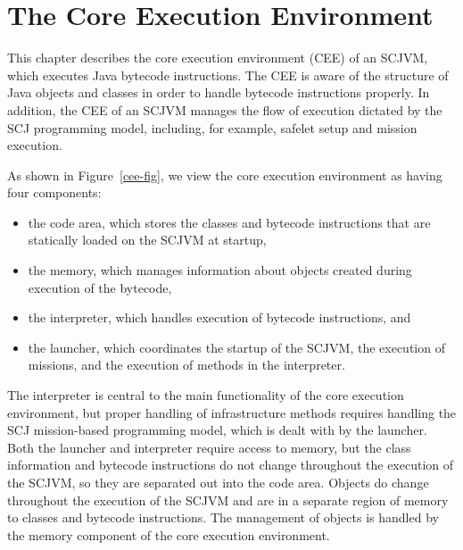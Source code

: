 \chapter{The Core Execution Environment}
\label{cee-chapter}

This chapter describes the core execution environment (CEE) of an
SCJVM, which executes Java bytecode instructions.
The CEE is aware of the structure of Java objects and classes in order
to handle bytecode instructions properly.
In addition, the CEE of an SCJVM manages the flow of execution
dictated by the SCJ programming model, including, for example, safelet
setup and mission execution.

As shown in Figure~\ref{cee-fig}, we view the core execution
environment as having four components:
\begin{itemize}
\item the code area, which stores the classes and bytecode
  instructions that are statically loaded on the SCJVM at startup,
\item the memory, which manages information about objects created
  during execution of the bytecode,
\item the interpreter, which handles execution of bytecode
  instructions, and
\item the launcher, which coordinates the startup of the SCJVM, the
  execution of missions, and the execution of methods in the
  interpreter.
\end{itemize}
The interpreter is central to the main functionality of the core
execution environment, but proper handling of infrastructure methods
requires handling the SCJ mission-based programming model, which is
dealt with by the launcher.
Both the launcher and interpreter require access to memory, but the
class information and bytecode instructions do not change throughout
the execution of the SCJVM, so they are separated out into the code
area.
Objects do change throughout the execution of the SCJVM and are in a
separate region of memory to classes and bytecode instructions.
The management of objects is handled by the memory component of the
core execution environment.
 

